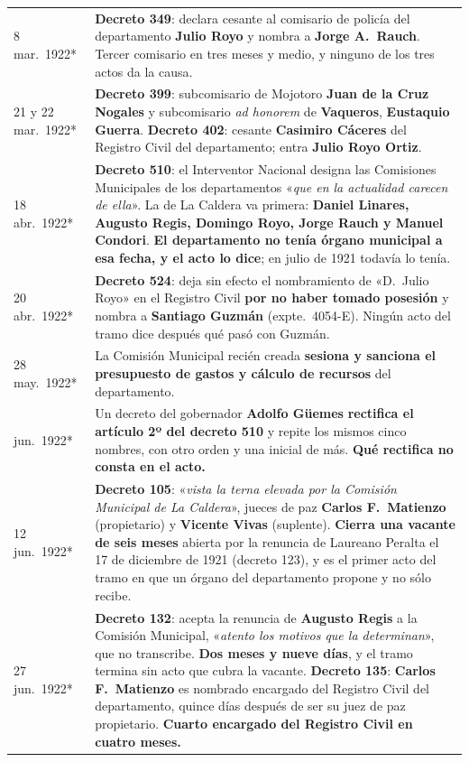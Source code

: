 \begin{longtable}{@{}p{2.7cm}p{10.3cm}@{}}
8 mar.\ 1922* & \textbf{Decreto 349}: declara cesante al comisario de policía del departamento \textbf{Julio Royo} y nombra a \textbf{Jorge A.\ Rauch}. Tercer comisario en tres meses y medio, y ninguno de los tres actos da la causa. \\
21 y 22 mar.\ 1922* & \textbf{Decreto 399}: subcomisario de Mojotoro \textbf{Juan de la Cruz Nogales} y subcomisario \textit{ad honorem} de \textbf{Vaqueros}, \textbf{Eustaquio Guerra}. \textbf{Decreto 402}: cesante \textbf{Casimiro Cáceres} del Registro Civil del departamento; entra \textbf{Julio Royo Ortiz}. \\
18 abr.\ 1922* & \textbf{Decreto 510}: el Interventor Nacional designa las Comisiones Municipales de los departamentos «\textit{que en la actualidad carecen de ella}». La de La Caldera va primera: \textbf{Daniel Linares\index{Linares, Daniel}, Augusto Regis\index{Regis, Augusto}, Domingo Royo, Jorge Rauch y Manuel Condori}. \textbf{El departamento no tenía órgano municipal a esa fecha, y el acto lo dice}; en julio de 1921 todavía lo tenía. \\
20 abr.\ 1922* & \textbf{Decreto 524}: deja sin efecto el nombramiento de «D.\ Julio Royo» en el Registro Civil \textbf{por no haber tomado posesión} y nombra a \textbf{Santiago Guzmán} (expte.\ 4054-E). Ningún acto del tramo dice después qué pasó con Guzmán. \\
28 may.\ 1922* & La Comisión Municipal recién creada \textbf{sesiona y sanciona el presupuesto de gastos y cálculo de recursos} del departamento. \\
jun.\ 1922* & Un decreto del gobernador \textbf{Adolfo Güemes} \textbf{rectifica el artículo 2º del decreto 510} y repite los mismos cinco nombres, con otro orden y una inicial de más. \textbf{Qué rectifica no consta en el acto.} \\
12 jun.\ 1922* & \textbf{Decreto 105}: «\textit{vista la terna elevada por la Comisión Municipal de La Caldera}», jueces de paz \textbf{Carlos F.\ Matienzo}\index{Matienzo, Carlos} (propietario) y \textbf{Vicente Vivas} (suplente). \textbf{Cierra una vacante de seis meses} abierta por la renuncia de Laureano Peralta el 17 de diciembre de 1921 (decreto 123), y es el primer acto del tramo en que un órgano del departamento propone y no sólo recibe. \\
27 jun.\ 1922* & \textbf{Decreto 132}: acepta la renuncia de \textbf{Augusto Regis}\index{Regis, Augusto} a la Comisión Municipal, «\textit{atento los motivos que la determinan}», que no transcribe. \textbf{Dos meses y nueve días}, y el tramo termina sin acto que cubra la vacante. \textbf{Decreto 135}: \textbf{Carlos F.\ Matienzo}\index{Matienzo, Carlos} es nombrado encargado del Registro Civil del departamento, quince días después de ser su juez de paz propietario. \textbf{Cuarto encargado del Registro Civil en cuatro meses.} \\

\end{longtable}

